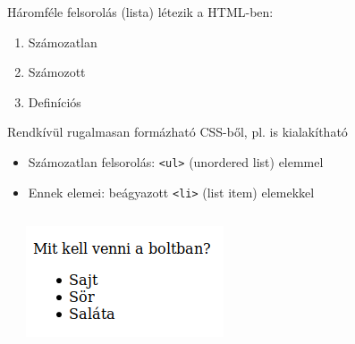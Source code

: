 \begin{frame}
  Háromféle felsorolás (lista) létezik a HTML-ben:
  \begin{enumerate}
    \item Számozatlan
    \item Számozott
    \item Definíciós
  \end{enumerate}
  \vfill
  Rendkívül rugalmasan formázható CSS-ből, pl.  is kialakítható
\end{frame}

\begin{frame}
  \begin{itemize}
    \item Számozatlan felsorolás: \texttt{<ul>} (unordered list) elemmel
    \item Ennek elemei: beágyazott \texttt{<li>} (list item) elemekkel
  \end{itemize}
  \begin{columns}[T]
      \begin{exampleblock}{}
        \footnotesize
        
      \end{exampleblock}
      \centering \includegraphics[width=\textwidth]{bevasarlas.png}
  \end{columns}
\end{frame}

